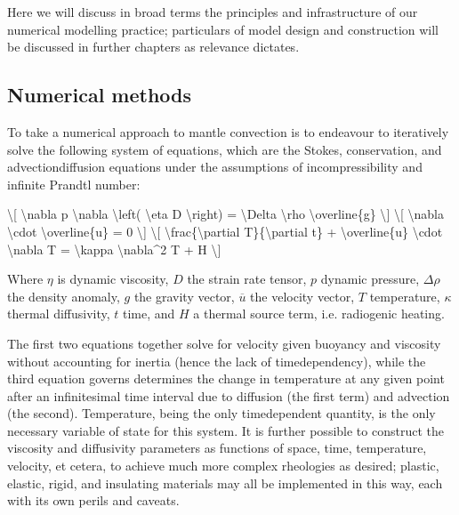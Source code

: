 \documentclass[letterpaper,10pt,english]{jupyterBook}
\begin{document}
\sphinxAtStartPar
Here we will discuss in broad terms the principles and infrastructure of our numerical modelling practice; particulars of model design and construction will be discussed in further chapters as relevance dictates.


\subsection{Numerical methods}
\label{\detokenize{content/chapter_02_methods/section2:numerical-methods}}
\sphinxAtStartPar
To take a numerical approach to mantle convection is to endeavour to iteratively solve the following system of equations, which are the Stokes, conservation, and advection\sphinxhyphen{}diffusion equations under the assumptions of incompressibility and infinite Prandtl number:

\sphinxAtStartPar
\textbackslash{}{[} \textbackslash{}nabla p \sphinxhyphen{} \textbackslash{}nabla \textbackslash{}left( \textbackslash{}eta D \textbackslash{}right) = \textbackslash{}Delta \textbackslash{}rho \textbackslash{}overline\{g\} \textbackslash{}{]}
\textbackslash{}{[} \textbackslash{}nabla \textbackslash{}cdot \textbackslash{}overline\{u\} = 0 \textbackslash{}{]}
\textbackslash{}{[} \textbackslash{}frac\{\textbackslash{}partial T\}\{\textbackslash{}partial t\} + \textbackslash{}overline\{u\} \textbackslash{}cdot \textbackslash{}nabla T = \textbackslash{}kappa \textbackslash{}nabla\textasciicircum{}2 T + H \textbackslash{}{]}

\sphinxAtStartPar
Where \(\eta\) is dynamic viscosity, \(D\) the strain rate tensor, \(p\) dynamic pressure, \(\Delta\rho\) the density anomaly, \(g\) the gravity vector, \(\overline{u}\) the velocity vector, \(T\) temperature, \(\kappa\) thermal diffusivity, \(t\) time, and \(H\) a thermal source term, i.e. radiogenic heating.

\sphinxAtStartPar
The first two equations together solve for velocity given buoyancy and viscosity without accounting for inertia (hence the lack of time\sphinxhyphen{}dependency), while the third equation governs determines the change in temperature at any given point after an infinitesimal time interval due to diffusion (the first term) and advection (the second). Temperature, being the only time\sphinxhyphen{}dependent quantity, is the only necessary variable of state for this system. It is further possible to construct the viscosity and diffusivity parameters as functions of space, time, temperature, velocity, et cetera, to achieve much more complex rheologies as desired; plastic, elastic, rigid, and insulating materials may all be implemented in this way, each with its own perils and caveats.
\end{document}
